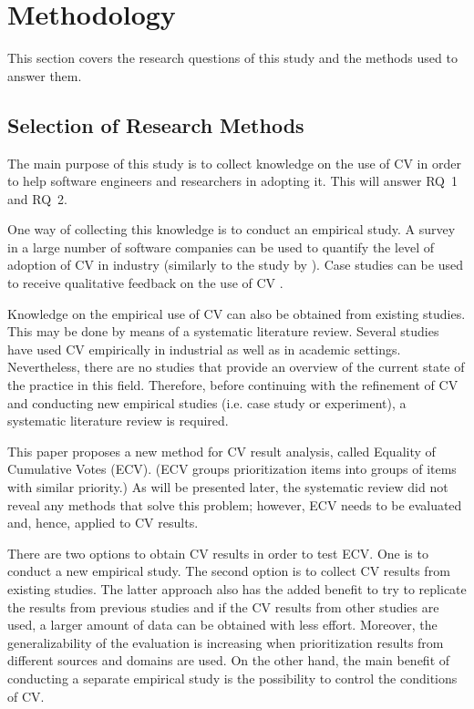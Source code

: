 \section{Methodology\label{methodology}}

This section covers the research questions of this study and the methods used to answer them.

\subsection{Selection of Research Methods}

The main purpose of this study is to collect knowledge on the use of CV in order to help software engineers and researchers in adopting it. This will answer RQ~1 and RQ~2.

One way of collecting this knowledge is to conduct an empirical study. A
survey in a large number of software companies can be used to quantify the
level of adoption of CV in industry (similarly to the study by \citep{Zahedi1986}).
Case studies can be used to receive qualitative feedback on the use of CV
\citep{Runeson2008}.

Knowledge on the empirical use of CV can also be obtained from existing
studies. This may be done by means of a systematic literature review. Several
studies have used CV empirically in industrial as well as in academic settings.
Nevertheless, there are no studies that provide an overview of the current state
of the practice in this field. Therefore, before continuing with the refinement
of CV and conducting new empirical studies (i.e. case study or experiment), a systematic literature review is
required.

This paper proposes a new method for CV result analysis, called Equality of Cumulative Votes (ECV).
(ECV groups prioritization items into groups of items with similar priority.)
As will be presented later, the systematic review did not reveal any methods that solve this problem; however, ECV needs to be evaluated and, hence, applied to CV results.

There are two options to obtain CV results in order to test ECV. One is to conduct a new empirical study. The second option is to collect CV results from existing studies. The latter approach also has the added benefit to try to replicate the results from previous studies and if the CV results from other studies are used, a larger amount of data can be obtained with less effort. Moreover, the generalizability of the evaluation is increasing when prioritization results from different sources and domains are used.
On the other hand, the main benefit of conducting a separate empirical study is the possibility to control the conditions of CV.

